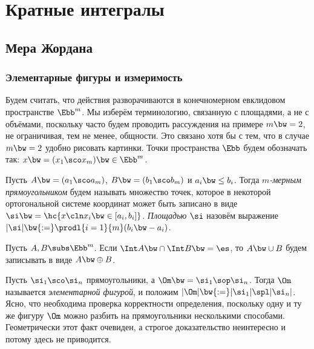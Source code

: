 \documentclass[a4paper]{article}
\begin{document}
\pagebreak
\pagestyle{headings}

\makeatletter
  \renewcommand{\headheight}{11mm}
  \renewcommand{\headsep}{2mm}
  \renewcommand{\sectionmark}[1]{}
  \renewcommand{\subsectionmark}[1]{}
  \renewcommand{\subsubsectionmark}[1]{\markright{\thesubsubsection. #1}}
  \renewcommand{\@oddhead}{\vbox{\hbox to \textwidth{\scriptsize\thepage\hfil\rightmark\strut}\hrule}}
  \renewcommand{\@oddfoot}{\hfil\thepage\hfil}
\makeatother

\section{Кратные интегралы}

\subsection{Мера Жордана}

\subsubsection{Элементарные фигуры и измеримость}

Будем считать, что действия разворачиваются в конечномерном евклидовом пространстве $\Ebb^m$. Мы
изберём терминологию, связанную с площадями, а не с объёмами, поскольку часто будем проводить
рассуждения на примере $m\bw=2$, не ограничивая, тем не менее, общности. Это связано хотя бы с тем,
что в случае $m\bw=2$ удобно рисовать картинки. Точки пространства $\Ebb$ будем обозначать так:
$x\bw=(x_1\sco x_m) \bw\in \Ebb^m$.

\begin{df}
Пусть $A\bw=(a_1\sco a_m)$, $B\bw=(b_1\sco b_m)$ и $a_i \bw\le b_i$. Тогда \emph{$m$-мерным
прямоугольником} будем называть множество точек, которое в некоторой ортогональной системе
координат может быть записано в виде $\si\bw= \hc{x \cln x_i \bw\in [a_i,b_i]}$. \emph{Площадью} $\si$
назовём выражение $|\si| \bw{:=} \prodl{i=1}{m}(b_i\bw-a_i)$.
\end{df}

\begin{df}
Пусть $A, B \subs \Ebb^m$. Если $\Int A \bw\cap \Int B \bw= \es$, то $A \bw\cup B$ будем записывать
в виде $A \bw\oplus B$.
\end{df}

\begin{df}
Пусть $\si_1\sco\si_n$ прямоугольники, а $\Om \bw= \si_1\sop\si_n$. Тогда $\Om$ называется
\emph{элементарной фигурой}, и положим $|\Om| \bw{:=} |\si_1|\spl|\si_n|$. Ясно, что необходима
проверка корректности определения, поскольку одну и ту же фигуру $\Om$ можно разбить на
прямоугольники несколькими способами. Геометрически этот факт очевиден, а строгое доказательство
неинтересно и потому здесь не приводится.
\end{df}
\end{document}
